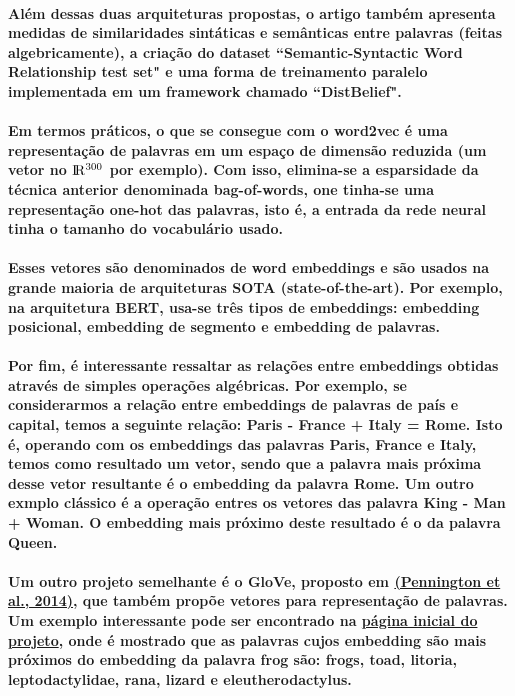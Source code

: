 \documentclass[a4paper]{article}    %
\begin{document}
\paragraph{Além dessas duas arquiteturas propostas, o artigo também apresenta medidas de similaridades sintáticas e semânticas entre palavras (feitas algebricamente), a criação do dataset ``Semantic-Syntactic Word Relationship test set" e uma forma de treinamento paralelo implementada em um framework chamado “DistBelief".}

\paragraph{Em termos práticos, o que se consegue com o word2vec é uma representação de palavras em um espaço de dimensão reduzida (um vetor no ${\rm I\!R^{300}}$ por exemplo). Com isso, elimina-se a esparsidade da técnica anterior denominada bag-of-words, one tinha-se uma representação one-hot das palavras, isto é, a entrada da rede neural tinha o tamanho do vocabulário usado.}

\paragraph{Esses vetores são denominados de word embeddings e são usados na grande maioria de arquiteturas SOTA (state-of-the-art). Por exemplo, na arquitetura BERT, usa-se três tipos de embeddings: embedding posicional, embedding de segmento e embedding de palavras.}

\paragraph{Por fim, é interessante ressaltar as relações entre embeddings obtidas através de simples operações algébricas. Por exemplo, se considerarmos a relação entre embeddings de palavras de país e capital, temos a seguinte relação: Paris - France + Italy = Rome. Isto é, operando com os embeddings das palavras Paris, France e Italy, temos como resultado um vetor, sendo que a palavra mais próxima desse vetor resultante é o embedding da palavra Rome. Um outro exmplo clássico é a operação entres os vetores das palavra King - Man + Woman. O embedding mais próximo deste resultado é o da palavra Queen.}

\paragraph{Um outro projeto semelhante é o GloVe, proposto em \href{https://github.com/ito-rafael/machine-learning/blob/master/papers/NLP/2014\%20-\%20\%5BGloVe\%5D\%20GloVe:\%20Global\%20Vectors\%20for\%20Word\%20Representation\%20\%5BStanford\%20University\%5D\%20(Pennington\%20et\%20al.\%2C\%202014).pdf}{(Pennington et al., 2014)}, que também propõe vetores para representação de palavras. Um exemplo interessante pode ser encontrado na \href{https://nlp.stanford.edu/projects/glove/}{página inicial do projeto}, onde é mostrado que as palavras cujos embedding são mais próximos do embedding da palavra frog são: frogs, toad, litoria, leptodactylidae, rana, 
lizard e eleutherodactylus.}
\end{document}
